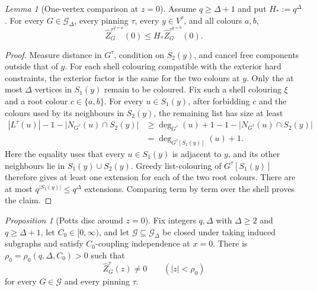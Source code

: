 \documentclass[11pt,reqno]{article}
\theoremstyle{plain}
\newtheorem{proposition}[theorem]{Proposition}
\newtheorem{lemma}[theorem]{Lemma}
\theoremstyle{definition}
\theoremstyle{remark}
\newtheorem{proposition}[proposition]{Proposition}
\newtheorem{lemma}[lemma]{Lemma}
\theoremstyle{definition}
\theoremstyle{remark}
\newcommand{\Deg}{\Delta}                        %
\newcommand{\Gdeg}{\mathcal{G}_{\Deg}}
\newcommand{\nZpin}[2]{\widehat Z_{#1}^{#2}}
\newcommand{\hardlist}[2]{L^{#1}(#2)}
\begin{document}
\begin{lemma}[One-vertex comparison at \texorpdfstring{\(z=0\)}{z=0}]\label{lem:potts-hard-comparison}
Assume \(q\ge\Deg+1\) and put \(H_*:=q^\Deg\).  For every
\(G\in\Gdeg\), every pinning \(\tau\), every \(y\in V^\tau\), and all
colours \(a,b\),
\begin{equation}\label{eq:potts-hard-comparison}
  \nZpin{G}{\tau^{y=a}}(0)
  \le H_*\nZpin{G}{\tau^{y=b}}(0).
\end{equation}
\end{lemma}

\begin{proof}
Measure distance in \(G^\tau\), condition on \(S_2(y)\), and cancel free
components outside that of \(y\).  For each shell colouring compatible
with the exterior hard constraints, the exterior factor is the same for
the two colours at \(y\).  Only the at most \(\Deg\) vertices in
\(S_1(y)\) remain to be coloured.  Fix such a shell colouring \(\xi\)
and a root colour \(c\in\{a,b\}\).  For every \(u\in S_1(y)\), after
forbidding \(c\) and the colours used by its neighbours in \(S_2(y)\),
the remaining list has size at least
\[
\begin{aligned}
 |\hardlist{\tau}{u}|-1-|N_{G^\tau}(u)\cap S_2(y)|
 &\ge \deg_{G^\tau}(u)+1-1-|N_{G^\tau}(u)\cap S_2(y)|\\
 &=\deg_{G^\tau[S_1(y)]}(u)+1.
\end{aligned}
\]
Here the equality uses that every \(u\in S_1(y)\) is adjacent to \(y\),
and its other neighbours lie in \(S_1(y)\cup S_2(y)\).  Greedy
list-colouring of \(G^\tau[S_1(y)]\) therefore gives at least one extension
for each of the two root colours.  There are at most
\(q^{|S_1(y)|}\le q^\Deg\) extensions.  Comparing term by term over the
shell proves the claim.
\end{proof}

\begin{proposition}[Potts disc around \texorpdfstring{\(z=0\)}{z=0}]\label{prop:ep-disc}
Fix integers \(q,\Deg\) with \(\Deg\ge2\) and \(q\ge\Deg+1\), let
\(C_0\in[0,\infty)\), and let
\(\mathcal G\subseteq\Gdeg\) be closed under taking induced subgraphs and satisfy
\(C_0\)-coupling independence at \(x=0\).  There is
\(\rho_0=\rho_0(q,\Deg,C_0)>0\) such that
\[
  \nZpin{G}{\tau}(z)\ne0
  \qquad(|z|<\rho_0)
\]
for every \(G\in\mathcal G\) and every pinning \(\tau\).
\end{proposition}
\end{document}

